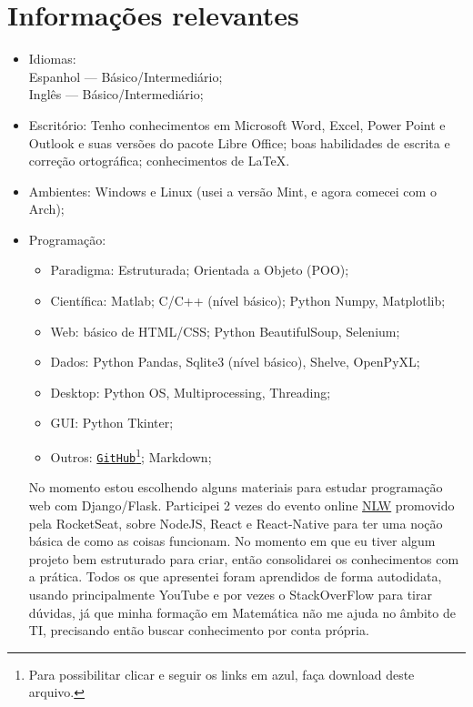 \documentclass[11pt]{article}
\begin{document}
\section{Informações relevantes \dotfill}
\begin{itemize}
\item Idiomas: \\Espanhol --- Básico/Intermediário;\\ Inglês --- Básico/Intermediário;

\item Escritório: Tenho conhecimentos em Microsoft Word, Excel, Power Point e Outlook e suas versões do pacote Libre Office; boas habilidades de escrita e correção ortográfica; conhecimentos de LaTeX.

\item Ambientes: Windows e Linux (usei a versão Mint, e agora comecei com o Arch);

\item Programação:
\begin{itemize}
\item Paradigma: Estruturada; Orientada a Objeto (POO);
\item Científica: Matlab; C/C++ (nível básico); Python Numpy, Matplotlib;
\item Web: básico de HTML/CSS; Python BeautifulSoup, Selenium;
\item Dados: Python Pandas, Sqlite3 (nível básico), Shelve, OpenPyXL;
\item Desktop: Python OS, Multiprocessing, Threading;
\item GUI: Python Tkinter;
\item Outros: \href{https://github.com/j5r}{\texttt{GitHub}}\footnote{Para possibilitar clicar e seguir os links em azul, faça download deste arquivo.}; Markdown;
\end{itemize}
No momento estou escolhendo alguns materiais para estudar programação web com Django/Flask. Participei 2 vezes do evento online \href{https://github.com/j5r/mycv/blob/master/jrodrib@usp.br.pdf}{NLW} promovido pela RocketSeat, sobre NodeJS, React e React-Native para ter uma noção básica de como as coisas funcionam.  No momento em que eu tiver algum projeto bem estruturado para criar, então consolidarei os conhecimentos com a prática. Todos os que apresentei foram aprendidos de forma autodidata, usando principalmente YouTube e por vezes o StackOverFlow para tirar dúvidas, já que minha formação em Matemática não me ajuda no âmbito de TI, precisando então buscar conhecimento por conta própria. 


\end{itemize}
\end{document}
